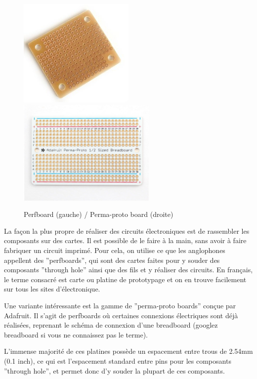 \documentclass[a4paper, 11pt]{report}
\begin{document}
\begin{figure}[h]
\caption{Perfboard (gauche) / Perma-proto board (droite)}

\centering{}\includegraphics[width=0.5\textwidth]{images/perfboard}\includegraphics[width=0.6\textwidth]{images/perma_proto_board.jpg}
\end{figure}

La façon la plus propre de réaliser des circuits électroniques est
de rassembler les composants sur des cartes. Il est possible de le
faire à la main, sans avoir à faire fabriquer un circuit imprimé.
Pour cela, on utilise ce que les anglophones appellent des ''perfboards'',
qui sont des cartes faites pour y souder des composants ''through
hole'' ainsi que des fils et y réaliser des circuits. En français,
le terme consacré est carte ou platine de prototypage et on en trouve
facilement sur tous les sites d'électronique.

Une variante intéressante est la gamme de ''perma-proto boards''
conçue par Adafruit. Il s'agit de perfboards où certaines connexions
électriques sont déjà réalisées, reprenant le schéma de connexion
d'une breadboard (googlez breadboard si vous ne connaissez pas le
terme).

L'immense majorité de ces platines possède un espacement entre trous
de 2.54mm (0.1 inch), ce qui est l'espacement standard entre pins
pour les composants ''through hole'', et permet donc d'y souder
la plupart de ces composants.
\end{document}
